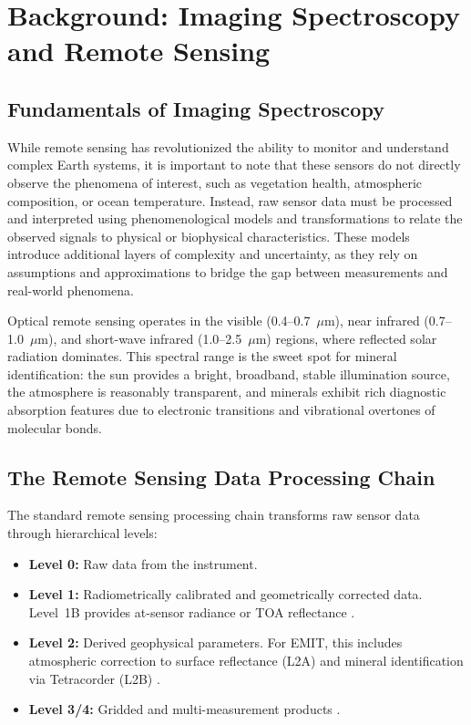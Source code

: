 \documentclass[11pt]{report}
\begin{document}
\chapter{Background: Imaging Spectroscopy and Remote Sensing}
\label{chap:background}

\section{Fundamentals of Imaging Spectroscopy}

While remote sensing has revolutionized the ability to monitor and understand complex Earth systems, it is important to note that these sensors do not directly observe the phenomena of interest, such as vegetation health, atmospheric composition, or ocean temperature. Instead, raw sensor data must be processed and interpreted using phenomenological models and transformations to relate the observed signals to physical or biophysical characteristics. These models introduce additional layers of complexity and uncertainty, as they rely on assumptions and approximations to bridge the gap between measurements and real-world phenomena.

Optical remote sensing operates in the visible (0.4--0.7~$\mu$m), near infrared (0.7--1.0~$\mu$m), and short-wave infrared (1.0--2.5~$\mu$m) regions, where reflected solar radiation dominates. This spectral range is the sweet spot for mineral identification: the sun provides a bright, broadband, stable illumination source, the atmosphere is reasonably transparent, and minerals exhibit rich diagnostic absorption features due to electronic transitions and vibrational overtones of molecular bonds.


\section{The Remote Sensing Data Processing Chain}

The standard remote sensing processing chain transforms raw sensor data through hierarchical levels:
\begin{itemize}
  \item \textbf{Level 0:} Raw data from the instrument.
  \item \textbf{Level 1:} Radiometrically calibrated and geometrically corrected data. Level~1B provides at-sensor radiance or TOA reflectance \cite{emit_l1b_atbd}.
  \item \textbf{Level 2:} Derived geophysical parameters. For EMIT, this includes atmospheric correction to surface reflectance (L2A) \cite{emit_l2a_atbd} and mineral identification via Tetracorder (L2B) \cite{emit_l2b_atbd}.
  \item \textbf{Level 3/4:} Gridded and multi-measurement products \cite{emit_l3_atbd}.
\end{itemize}
\end{document}
